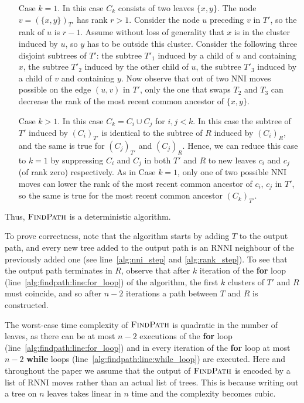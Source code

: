 \documentclass[11pt]{amsart}
\newcommand{\rnni}{\mathrm{RNNI}}
\newcommand{\findpath}{\textsc{FindPath}}
\newcommand{\nni}{\mathrm{NNI}}
\begin{document}
\begin{itemize}
\item[Case $k = 1$.]
In this case $C_k$ consists of two leaves $\{x, y\}$.
The node $v = (\{x, y\})_{T'}$ has rank $r > 1$.
Consider the node $u$ preceding $v$ in $T'$, so the rank of $u$ is $r - 1$.
Assume without loss of generality that $x$ is in the cluster induced by $u$, so $y$ has to be outside this cluster.
Consider the following three disjoint subtrees of $T'$: the subtree $T'_1$ induced by a child of $u$ and containing $x$, the subtree $T'_2$ induced by the other child of $u$, the subtree $T'_3$ induced by a child of $v$ and containing $y$.
Now observe that out of two $\nni$ moves possible on the edge $(u, v)$ in $T'$, only the one that swaps $T_2$ and $T_3$ can decrease the rank of the most recent common ancestor of $\{x, y\}$.

\item[Case $k > 1$.]
In this case $C_k = C_i \cup C_j$ for $i, j < k$.
In this case the subtree of $T'$ induced by $(C_i)_{T'}$ is identical to the subtree of $R$ induced by $(C_i)_R$, and the same is true for $(C_j)_{T'}$ and $(C_j)_R$.
Hence, we can reduce this case to $k = 1$ by suppressing $C_i$ and $C_j$ in both $T'$ and $R$ to new leaves $c_i$ and $c_j$ (of rank zero) respectively.
As in Case $k = 1$, only one of two possible $\nni$ moves can lower the rank of the most recent common ancestor of $c_i$, $c_j$ in $T'$, so the same is true for the most recent common ancestor $(C_k)_{T'}$.
\end{itemize}

Thus, $\findpath$ is a deterministic algorithm.

To prove correctness, note that the algorithm starts by adding $T$ to the output path, and every new tree added to the output path is an $\rnni$ neighbour of the previously added one (see line~\ref{alg:nni_step} and \ref{alg:rank_step}).
To see that the output path terminates in $R$, observe that after $k$ iteration of the \textbf{for} loop (line~\ref{alg:findpath:line:for_loop}) of the algorithm, the first $k$ clusters of $T'$ and $R$ must coincide, and so after $n-2$ iterations a path between $T$ and $R$ is constructed.

The worst-case time complexity of $\findpath$ is quadratic in the number of leaves, as there can be at most $n-2$ executions of the \textbf{for} loop (line~\ref{alg:findpath:line:for_loop}) and in every iteration of the \textbf{for} loop at most $n-2$ \textbf{while} loops (line~\ref{alg:findpath:line:while_loop}) are executed.
Here and throughout the paper we assume that the output of $\findpath$ is encoded by a list of $\rnni$ moves rather than an actual list of trees.
This is because writing out a tree on $n$ leaves takes linear in $n$ time and the complexity becomes cubic.
\endproof
\end{document}
